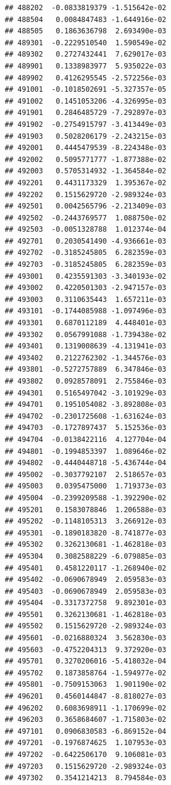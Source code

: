 \begin{frame}[fragile]
\begin{verbatim}
## 488202  -0.0833819379 -1.515642e-02
## 488504   0.0084847483 -1.644916e-02
## 488505   0.1863636798  2.693490e-03
## 489301  -0.2229510540  1.590549e-02
## 489302   0.2727432441  7.629017e-03
## 489901   0.1338983977  5.935022e-03
## 489902   0.4126295545 -2.572256e-03
## 491001  -0.1018502691 -5.327357e-05
## 491002   0.1451053206 -4.326995e-03
## 491901   0.2846485729 -7.292897e-03
## 491902  -0.2754915797 -3.413449e-03
## 491903   0.5028206179 -2.243215e-03
## 492001   0.4445479539 -8.224348e-03
## 492002   0.5095771777 -1.877388e-02
## 492003   0.5705314932 -1.364584e-02
## 492201   0.4431173329  1.395367e-02
## 492202   0.1515629720 -2.989324e-03
## 492501   0.0042565796 -2.213409e-03
## 492502  -0.2443769577  1.088750e-02
## 492503  -0.0051328788  1.012374e-04
## 492701   0.2030541490 -4.936661e-03
## 492702  -0.3185245805  6.282359e-03
## 492703  -0.3185245805  6.282359e-03
## 493001   0.4235591303 -3.340193e-02
## 493002   0.4220501303 -2.947157e-03
## 493003   0.3110635443  1.657211e-03
## 493101  -0.1744085988 -1.097496e-03
## 493301   0.6870112189  4.448401e-03
## 493302   0.0567991088 -1.739438e-02
## 493401   0.1319008639 -4.131941e-03
## 493402   0.2122762302 -1.344576e-03
## 493801  -0.5272757889  6.347846e-03
## 493802   0.0928578091  2.755846e-03
## 494301   0.5165497042 -3.101929e-03
## 494701   0.1951054082 -3.892808e-03
## 494702  -0.2301725608 -1.631624e-03
## 494703  -0.1727897437  5.152536e-03
## 494704  -0.0138422116  4.127704e-04
## 494801  -0.1994853397  1.089646e-02
## 494802  -0.4440448718 -5.436744e-04
## 495002  -0.3037792107  2.518657e-03
## 495003   0.0395475000  1.719373e-03
## 495004  -0.2399209588 -1.392290e-02
## 495201   0.1583078846  1.206588e-03
## 495202  -0.1148105313  3.266912e-03
## 495301  -0.1890183820 -8.741877e-03
## 495302   0.3262130681 -1.462818e-03
## 495304   0.3082588229 -6.079885e-03
## 495401   0.4581220117 -1.268940e-02
## 495402  -0.0690678949  2.059583e-03
## 495403  -0.0690678949  2.059583e-03
## 495404  -0.3317372758  9.892301e-03
## 495501   0.3262130681 -1.462818e-03
## 495502   0.1515629720 -2.989324e-03
## 495601  -0.0216880324  3.562830e-03
## 495603  -0.4752204313  9.372920e-03
## 495701   0.3270206016 -5.418032e-04
## 495702   0.1873858764 -1.594977e-02
## 495801  -0.7509153063  1.901190e-02
## 496201   0.4560144847 -8.818027e-03
## 496202   0.6083698911 -1.170699e-02
## 496203   0.3658684607 -1.715803e-02
## 497101   0.0906830583 -6.869152e-04
## 497201  -0.1976874625  1.107953e-03
## 497202  -0.6422506170  9.106081e-03
## 497203   0.1515629720 -2.989324e-03
## 497302   0.3541214213  8.794584e-03

\end{verbatim}
\end{frame}
